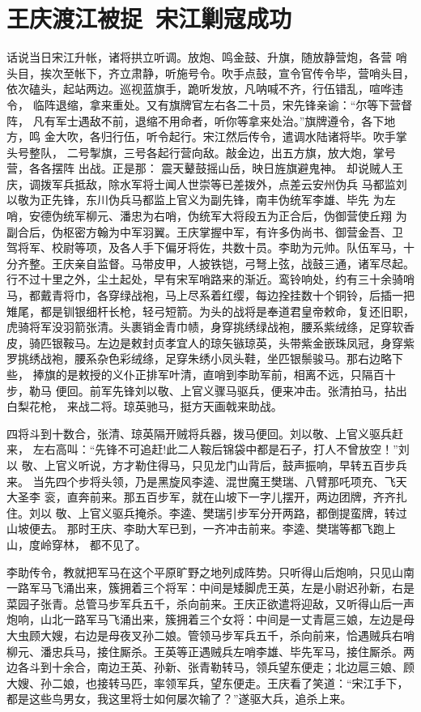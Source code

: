 \chapter{王庆渡江被捉~宋江剿寇成功}

话说当日宋江升帐，诸将拱立听调。放炮、鸣金鼓、升旗，随放静营炮，各营
哨头目，挨次至帐下，齐立肃静，听施号令。吹手点鼓，宣令官传令毕，营哨头目，
依次磕头，起站两边。巡视蓝旗手，跪听发放，凡呐喊不齐，行伍错乱，喧哗违令，
临阵退缩，拿来重处。又有旗牌官左右各二十员，宋先锋亲谕：“尔等下营督阵，
凡有军士遇敌不前，退缩不用命者，听你等拿来处治。”旗牌遵令，各下地方，鸣
金大吹，各归行伍，听令起行。宋江然后传令，遣调水陆诸将毕。吹手掌头号整队，
二号掣旗，三号各起行营向敌。敲金边，出五方旗，放大炮，掌号营，各各摆阵
出战。正是那：
震天鼙鼓摇山岳，映日旌旗避鬼神。
却说贼人王庆，调拨军兵抵敌，除水军将士闻人世崇等已差拨外，点差云安州伪兵
马都监刘以敬为正先锋，东川伪兵马都监上官义为副先锋，南丰伪统军李雄、毕先
为左哨，安德伪统军柳元、潘忠为右哨，伪统军大将段五为正合后，伪御营使丘翔
为副合后，伪枢密方翰为中军羽翼。王庆掌握中军，有许多伪尚书、御营金吾、卫
驾将军、校尉等项，及各人手下偏牙将佐，共数十员。李助为元帅。队伍军马，十
分齐整。王庆亲自监督。马带皮甲，人披铁铠，弓弩上弦，战鼓三通，诸军尽起。
行不过十里之外，尘土起处，早有宋军哨路来的渐近。鸾铃响处，约有三十余骑哨
马，都戴青将巾，各穿绿战袍，马上尽系着红缨，每边拴挂数十个铜铃，后插一把
雉尾，都是钏银细杆长枪，轻弓短箭。为头的战将是奉道君皇帝敕命，复还旧职，
虎骑将军没羽箭张清。头裹销金青巾帻，身穿挑绣绿战袍，腰系紫绒绦，足穿软香
皮，骑匹银鞍马。左边是敕封贞孝宜人的琼矢镞琼英，头带紫金嵌珠凤冠，身穿紫
罗挑绣战袍，腰系杂色彩绒绦，足穿朱绣小凤头鞋，坐匹银鬃骏马。那右边略下些，
捧旗的是敕授的义仆正排军叶清，直哨到李助军前，相离不远，只隔百十步，勒马
便回。前军先锋刘以敬、上官义骤马驱兵，便来冲击。张清拍马，拈出白梨花枪，
来战二将。琼英驰马，挺方天画戟来助战。

四将斗到十数合，张清、琼英隔开贼将兵器，拨马便回。刘以敬、上官义驱兵赶来，
左右高叫：“先锋不可追赶!此二人鞍后锦袋中都是石子，打人不曾放空！”刘以
敬、上官义听说，方才勒住得马，只见龙门山背后，鼓声振响，早转五百步兵来。
当先四个步将头领，乃是黑旋风李逵、混世魔王樊瑞、八臂那吒项充、飞天大圣李
衮，直奔前来。那五百步军，就在山坡下一字儿摆开，两边团牌，齐齐扎住。刘以
敬、上官义驱兵掩杀。李逵、樊瑞引步军分开两路，都倒提蛮牌，转过山坡便去。
那时王庆、李助大军已到，一齐冲击前来。李逵、樊瑞等都飞跑上山，度岭穿林，
都不见了。

李助传令，教就把军马在这个平原旷野之地列成阵势。只听得山后炮响，只见山南
一路军马飞涌出来，簇拥着三个将军：中间是矮脚虎王英，左是小尉迟孙新，右是
菜园子张青。总管马步军兵五千，杀向前来。王庆正欲遣将迎敌，又听得山后一声
炮响，山北一路军马飞涌出来，簇拥着三个女将：中间是一丈青扈三娘，左边是母
大虫顾大嫂，右边是母夜叉孙二娘。管领马步军兵五千，杀向前来，恰遇贼兵右哨
柳元、潘忠兵马，接住厮杀。王英等正遇贼兵左哨李雄、毕先军马，接住厮杀。两
边各斗到十余合，南边王英、孙新、张青勒转马，领兵望东便走；北边扈三娘、顾
大嫂、孙二娘，也接转马匹，率领军兵，望东便走。王庆看了笑道：“宋江手下，
都是这些鸟男女，我这里将士如何屡次输了？”遂驱大兵，追杀上来。

